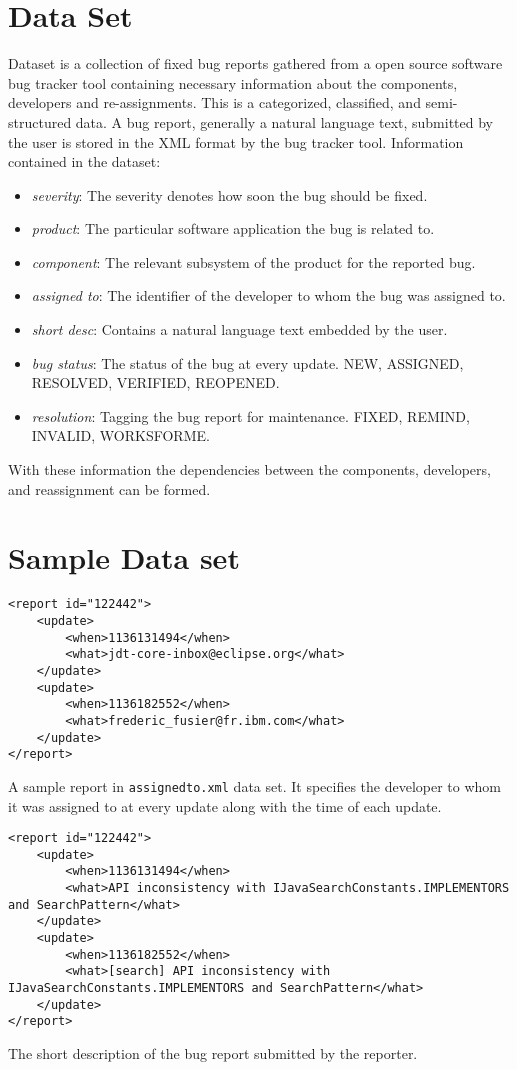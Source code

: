 \section{Data Set}
Dataset is a collection of fixed bug reports gathered from a open
source software bug tracker tool containing necessary information
about the components, developers and re-assignments. This is a
categorized, classified, and semi-structured data. A bug report, generally a
natural language text, submitted by the user is stored in the XML
format by the bug tracker tool. Information contained in the dataset:
\begin{itemize}
\item \emph{severity}: The severity denotes how soon the bug should be fixed.
\item \emph{product}: The particular software application the bug is related to.
\item \emph{component}: The relevant subsystem of the product for the reported bug.
\item \emph{assigned to}: The identifier of the developer to whom the bug was assigned to.
\item \emph{short desc}: Contains a natural language text embedded by the user.
\item \emph{bug status}: The status of the bug at every update. NEW, ASSIGNED, RESOLVED, VERIFIED, REOPENED.
\item \emph{resolution}: Tagging the bug report for maintenance. FIXED, REMIND, INVALID, WORKSFORME.
\end{itemize}
With these information the dependencies between the components, developers, and reassignment can be formed.

\section{Sample Data set}

\begin{verbatim}
<report id="122442">
	<update>
    	<when>1136131494</when>
      	<what>jdt-core-inbox@eclipse.org</what>
    </update>
    <update>
      	<when>1136182552</when>
      	<what>frederic_fusier@fr.ibm.com</what>
	</update>
</report>
\end{verbatim}
A sample report in \texttt{assignedto.xml} data set.  It specifies
the developer to whom it was assigned to at every update along with the time of each update.

\begin{verbatim}
<report id="122442">
    <update>
     	<when>1136131494</when>
      	<what>API inconsistency with IJavaSearchConstants.IMPLEMENTORS and SearchPattern</what>
    </update>
    <update>
      	<when>1136182552</when>
      	<what>[search] API inconsistency with IJavaSearchConstants.IMPLEMENTORS and SearchPattern</what>
	</update>
</report>
\end{verbatim}
The short description of the bug report submitted by the reporter.

